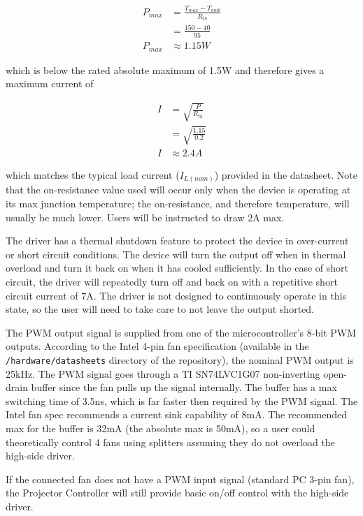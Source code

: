 \documentclass{article}
\begin{document}
\begin{align*}
    P_{max} &= \frac{T_{max}-T_{amb}}{R_{th}} \\
    &= \frac{150 - 40}{95} \\
    P_{max} &\approx 1.15W
\end{align*}

which is below the rated absolute maximum of 1.5W and therefore gives a maximum current of

\begin{align*}
    I &= \sqrt{\frac{P}{R_{th}}} \\
    &= \sqrt{\frac{1.15}{0.2}} \\
    I &\approx 2.4A
\end{align*}

which matches the typical load current ($I_{L(nom)}$) provided in the datasheet.  Note that the
on-resistance value used will occur only when the device is operating at its max junction
temperature; the on-resistance, and therefore temperature, will usually be much lower.  Users will
be instructed to draw 2A max.

The driver has a thermal shutdown feature to protect the device in over-current or short circuit
conditions.  The device will turn the output off when in thermal overload and turn it back on when
it has cooled sufficiently.  In the case of short circuit, the driver will repeatedly turn off and
back on with a repetitive short circuit current of 7A.  The driver is not designed to continuously
operate in this state, so the user will need to take care to not leave the output shorted.

The PWM output signal is supplied from one of the microcontroller's 8-bit PWM outputs.  According to
the Intel 4-pin fan specification (available in the \texttt{/hardware/datasheets} directory of the
repository), the nominal PWM output is 25kHz.  The PWM signal goes through a TI SN74LVC1G07
non-inverting open-drain buffer since the fan pulls up the signal internally. The buffer has a max
switching time of 3.5ns, which is far faster then required by the PWM signal.  The Intel fan spec
recommends a current sink capability of 8mA.  The recommended max for the buffer is 32mA (the
absolute max is 50mA), so a user could theoretically control 4 fans using splitters assuming they do
not overload the high-side driver.

If the connected fan does not have a PWM input signal (standard PC 3-pin fan), the Projector
Controller will still provide basic on/off control with the high-side driver.
\end{document}
